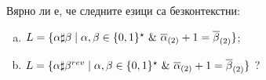 \begin{problem}
  Вярно ли е, че следните езици са безконтекстни:
  \begin{enumerate}[a)]
  \item 
    $L = \{\alpha\sharp\beta \mid \alpha,\beta \in \{0,1\}^\star\ \&\ \overline{\alpha}_{(2)} + 1 = \overline{\beta}_{(2)} \}$;
  \item
    $L = \{\alpha\sharp\beta^{rev} \mid \alpha,\beta \in \{0,1\}^\star\ \&\ \overline{\alpha}_{(2)} + 1 = \overline{\beta}_{(2)} \}$ ?
  \end{enumerate}
\end{problem}


